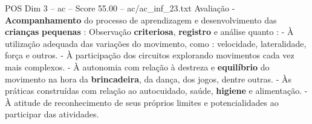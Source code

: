 \begin{textsample}{POS Dim 3 – ac – Score 55.00 – ac/ac\_inf\_23.txt}
Avaliação - \textbf{Acompanhamento} do processo de aprendizagem e desenvolvimento das \textbf{crianças} \textbf{pequenas} : Observação \textbf{criteriosa}, \textbf{registro} e análise quanto : - À utilização adequada das variações do movimento, como : velocidade, lateralidade, força e outros. - À participação dos circuitos explorando movimentos cada vez mais complexos. - À autonomia com relação à destreza e \textbf{equilíbrio} do movimento na hora da \textbf{brincadeira}, da dança, dos jogos, dentre outras. - Às práticas construídas com relação ao autocuidado, saúde, \textbf{higiene} e alimentação. - À atitude de reconhecimento de seus próprios limites e potencialidades ao participar das atividades.

\end{textsample}
